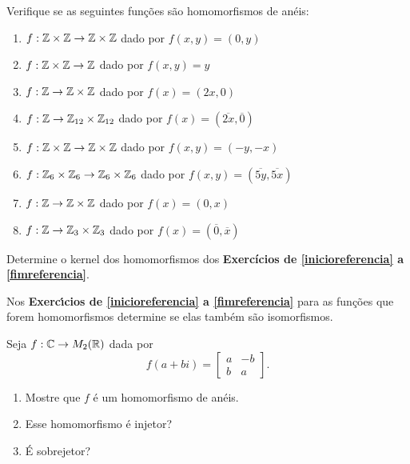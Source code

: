 \documentclass[12pt]{exam}
\begin{document}
     Verifique se as seguintes fun\c{c}\~oes s{\~a}o homomorfismos de an\'eis:
    \begin{enumerate}[label=({\alph*})]
        \item $f : \mathbb{Z}\times\mathbb{Z} \to \mathbb{Z}\times\mathbb{Z}$ dado por $f(x,y) = (0,y)$

        \item $f : \mathbb{Z}\times\mathbb{Z} \to \mathbb{Z}$ dado por $f(x,y) = y$

        \item $f : \mathbb{Z}\to \mathbb{Z}\times\mathbb{Z}$ dado por $f(x) = (2x,0)$

        \item $f : \mathbb{Z}\to \mathbb{Z}_{12}\times\mathbb{Z}_{12}$ dado por $f(x) = (\overline{2x},\overline{0})$

        \item $f : \mathbb{Z}\times\mathbb{Z} \to \mathbb{Z}\times\mathbb{Z}$ dado por $f(x,y) = (-y,-x)$

        \item $f : \mathbb{Z}_6\times\mathbb{Z}_6 \to \mathbb{Z}_6\times\mathbb{Z}_6$ dado por $f(x,y) = (\overline{5y},\overline{5x})$

        \item $f : \mathbb{Z} \to \mathbb{Z}\times\mathbb{Z}$ dado por $f(x) = (0,x)$

        \item $f : \mathbb{Z} \to \mathbb{Z}_3\times\mathbb{Z}_3$ dado por $f(x) = (\overline{0},\overline{x})$
    \end{enumerate}

    \vspace{.3cm}

    \questao{} Determine o kernel dos homomorfismos dos \textbf{Exerc{\'i}cios de \ref{inicioreferencia} a \ref{fimreferencia}}.

    \vspace{.3cm}

    \questao{} Nos \textbf{Exerc{\'\i}cios de \ref{inicioreferencia} a \ref{fimreferencia}} para as fun\c{c}\~oes que forem homomorfismos determine se elas tamb\'em s\~ao isomorfismos.

    \vspace{.3cm}

    \questao{} Seja $f : \mathbb{C} \to M_2(\mathbb{R})$ dada por
    \[
        f(a + bi) = \begin{bmatrix}
            a & -b\\
            b & a
        \end{bmatrix}.
    \]
    \begin{enumerate}[label=({\alph*})]
        \item Mostre que $f$ \'e um homomorfismo de an\'eis.

        \item Esse homomorfismo \'e injetor?

        \item \'E sobrejetor?
    \end{enumerate}
\end{document}
